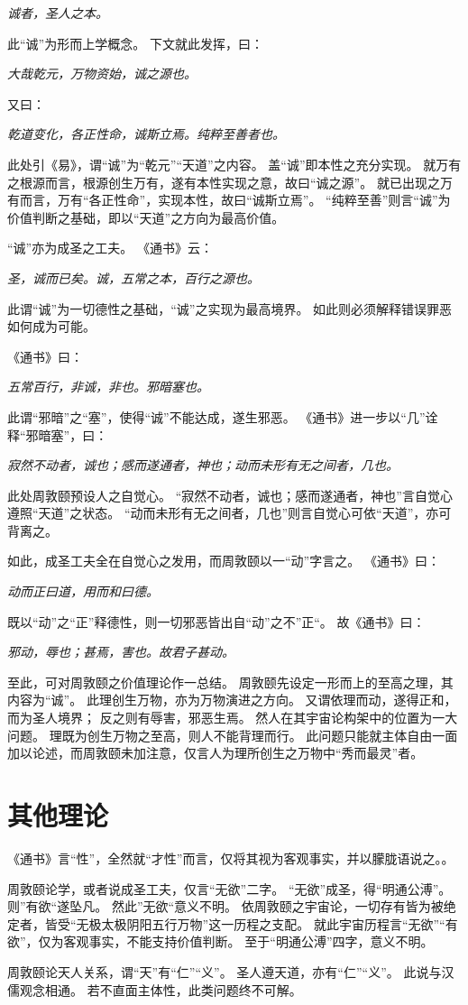\documentclass[11pt]{article}
\begin{document}
\textit{诚者，圣人之本。}

此“诚”为形而上学概念。
下文就此发挥，曰：

\textit{大哉乾元，万物资始，诚之源也。}

又曰：

\textit{乾道变化，各正性命，诚斯立焉。纯粹至善者也。}

此处引《易》，谓“诚”为“乾元”“天道”之内容。
盖“诚”即本性之充分实现。
就万有之根源而言，根源创生万有，遂有本性实现之意，故曰“诚之源”。
就已出现之万有而言，万有“各正性命”，实现本性，故曰“诚斯立焉”。
“纯粹至善”则言“诚”为价值判断之基础，即以“天道”之方向为最高价值。

\newline

“诚”亦为成圣之工夫。
《通书》云：

\textit{圣，诚而已矣。诚，五常之本，百行之源也。}

此谓“诚”为一切德性之基础，“诚”之实现为最高境界。
如此则必须解释错误罪恶如何成为可能。

《通书》曰：

\textit{五常百行，非诚，非也。邪暗塞也。}

此谓“邪暗”之“塞”，使得“诚”不能达成，遂生邪恶。
《通书》进一步以“几”诠释“邪暗塞”，曰：

\textit{寂然不动者，诚也；感而遂通者，神也；动而未形有无之间者，几也。}

此处周敦颐预设人之自觉心。
“寂然不动者，诚也；感而遂通者，神也”言自觉心遵照“天道”之状态。
“动而未形有无之间者，几也”则言自觉心可依“天道”，亦可背离之。

\newline

如此，成圣工夫全在自觉心之发用，而周敦颐以一“动”字言之。
《通书》曰：

\textit{动而正曰道，用而和曰德。}

既以“动”之“正”释德性，则一切邪恶皆出自“动”之不”正“。
故《通书》曰：

\textit{邪动，辱也；甚焉，害也。故君子甚动。}

\newline

至此，可对周敦颐之价值理论作一总结。
周敦颐先设定一形而上的至高之理，其内容为“诚”。
此理创生万物，亦为万物演进之方向。
又谓依理而动，遂得正和，而为圣人境界；
反之则有辱害，邪恶生焉。
然人在其宇宙论构架中的位置为一大问题。
理既为创生万物之至高，则人不能背理而行。
此问题只能就主体自由一面加以论述，而周敦颐未加注意，仅言人为理所创生之万物中“秀而最灵”者。

\section{其他理论}
《通书》言“性”，全然就“才性”而言，仅将其视为客观事实，并以朦胧语说之。。

\newline

周敦颐论学，或者说成圣工夫，仅言“无欲”二字。
“无欲”成圣，得“明通公溥”。
则”有欲“遂坠凡。
然此”无欲“意义不明。
依周敦颐之宇宙论，一切存有皆为被绝定者，皆受“无极太极阴阳五行万物”这一历程之支配。
就此宇宙历程言“无欲”“有欲”，仅为客观事实，不能支持价值判断。
至于“明通公溥”四字，意义不明。

\newline

周敦颐论天人关系，谓“天”有“仁”“义”。
圣人遵天道，亦有“仁”“义”。
此说与汉儒观念相通。
若不直面主体性，此类问题终不可解。
\end{document}
